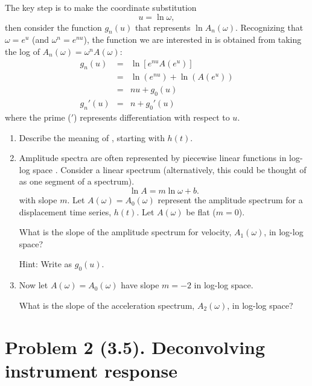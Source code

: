 \documentclass[11pt,titlepage,fleqn]{article}
\newcommand{\fft}{h}
\begin{document}
\begin{enumerate}
The key step is to make the coordinate substitution
%
\begin{equation}
u = \ln\omega,
\end{equation}
%
then consider the function $g_n(u)$ that represents $\ln A_n(\omega)$. Recognizing that $\omega = e^u$ (and $\omega^n = e^{nu}$), the function we are interested in is obtained from taking the log of \mbox{$A_n(\omega) = \omega^n A(\omega)$}:
%
\begin{eqnarray}
g_n(u) &=& \ln[ e^{nu} A(e^u) ]
\\
&=& \ln(e^{nu}) + \ln(A(e^u))
\\
&=& nu + g_0(u)
\\
g_n'(u) &=& n + g_0'(u)
\label{Anslope}
\end{eqnarray}
%
where the prime ($'$) represents differentiation with respect to $u$.

\begin{enumerate}
\item Describe the meaning of , starting with $\fft(t)$.

\item Amplitude spectra are often represented by piecewise linear functions in log-log space \citep[\eg][Figs.~6.3-6 and 6.6-8]{SteinWysession}. Consider a linear spectrum (alternatively, this could be thought of as one segment of a spectrum).
%
\begin{equation}
\ln A = m \ln\omega + b.
\label{Alin}
\end{equation}
%
with slope $m$.
Let $A(\omega) = A_0(\omega)$ represent the amplitude spectrum for a displacement time series, $\fft(t)$. Let $A(\omega)$ be flat ($m=0$).

What is the slope of the amplitude spectrum for velocity, $A_1(\omega)$, in log-log space?

Hint: Write  as $g_0(u)$.

\item Now let $A(\omega) = A_0(\omega)$ have slope $m=-2$ in log-log space.

What is the slope of the acceleration spectrum, $A_2(\omega)$, in log-log space?

\end{enumerate}

\end{enumerate}


\pagebreak
\section*{Problem 2 (3.5). Deconvolving instrument response}
\end{document}
